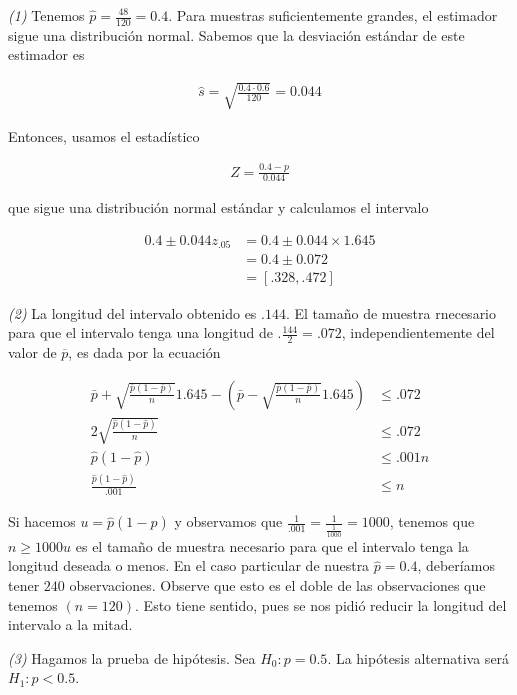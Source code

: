 \documentclass[a4paper, 12pt]{article}
\begin{document}
\textit{(1)} Tenemos $\hat{p} = \frac{48}{120} = 0.4$. Para muestras
suficientemente grandes, el estimador sigue una distribución normal. Sabemos que
la desviación estándar de este estimador es 

\begin{align*}
    \hat{s} = \sqrt{\frac{0.4 \cdot 0.6}{120}} = 0.044
\end{align*}

Entonces, usamos el estadístico

\begin{align*}
    Z = \frac{0.4 - p}{0.044}
\end{align*}

que sigue una distribución normal estándar y calculamos el intervalo 

\begin{align*}
    0.4 \pm 0.044 z_{.05} &= 0.4 \pm 0.044 \times 1.645 \\ 
    &=0.4 \pm 0.072 \\ 
    &= [.328, .472]
\end{align*}

\textit{(2)} La longitud del intervalo obtenido es $.144$. El tamaño de muestra
rnecesario para que el intervalo tenga una longitud de $.\frac{144}{2} = .072$,
independientemente del valor de $\overline{p}$,
es dada por la ecuación 

\begin{align*}
    \bar{p} + \sqrt{\frac{\bar{p}(1-\bar{p})}{{n} }} 1.645 - \left(\bar{p}
    - \sqrt{\frac{\bar{p}(1-\bar{p})}{{n} }} 1.645\right) &\leq .072 \\ 
    2 \sqrt{\frac{\hat{p}(1 - \hat{p})}{n }} &\leq .072 \\ 
    \hat{p}(1 - \hat{p}) &\leq
                                                    .001 n \\ 
                                                    \frac{\hat{p}(1 -
\hat{p})}{.001} &\leq n
\end{align*}

Si hacemos $u = \hat{p}(1 - \hat{p})$ y observamos que $\frac{1}{.001}
= \frac{1}{\frac{1}{1000}}=1000$, tenemos que $n \geq 1000u$ es el tamaño de
muestra necesario para que el intervalo tenga la longitud deseada o menos. En el
caso particular de nuestra $\hat{p} = 0.4$, deberíamos tener $240$
observaciones. Observe que esto es el doble de las observaciones que tenemos $(n
= 120)$. Esto tiene sentido, pues se nos pidió reducir la longitud del intervalo
a la mitad.


\textit{(3)} Hagamos la prueba de hipótesis. Sea $H_0 : p = 0.5$. La hipótesis
alternativa será $H_1 : p < 0.5$.
\end{document}
